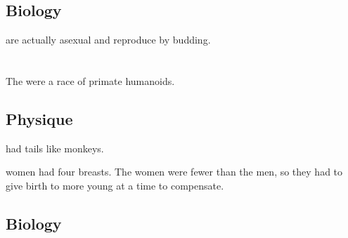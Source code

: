 \subsection{Biology}
\Naiads{} are actually asexual and reproduce by budding. 
































\section{\Nephil}
\index{\nephil}
The \nephilim were a race of primate humanoids. 









\subsection{Physique}
\Nephilim had tails like monkeys.

\Nephilic{} women had four breasts. 
The women were fewer than the men, so they had to give birth to more young at a time to compensate. 









\subsection{Biology}




